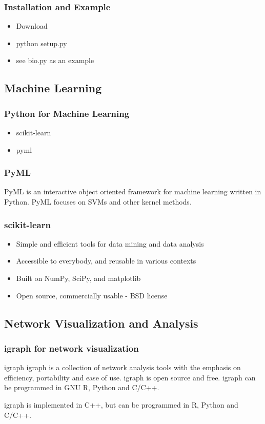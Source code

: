\documentclass[UTF8]{beamer}
\begin{document}
\begin{frame}
  \frametitle{Installation and Example}
  \begin{itemize}
    \item Download
    \item python setup.py
    \item see bio.py as an example
  \end{itemize}
\end{frame}


\subsection{Machine Learning}
\begin{frame}
  \frametitle{Python for Machine Learning}
  \begin{itemize}
    \item scikit-learn
    \item pyml
  \end{itemize}
\end{frame}

\begin{frame}
  \frametitle{PyML}
  PyML is an interactive object oriented framework for machine learning written
   in Python. PyML focuses on SVMs and other kernel methods.
\end{frame}

\begin{frame}
  \frametitle{scikit-learn}
  \begin{itemize}
    \item Simple and efficient tools for data mining and data analysis
    \item Accessible to everybody, and reusable in various contexts
    \item Built on NumPy, SciPy, and matplotlib
    \item Open source, commercially usable - BSD license
  \end{itemize}
\end{frame}

\subsection{Network Visualization and Analysis}
\begin{frame}
  \frametitle{igraph for network visualization}
  \begin{block}{igraph}
    igraph is a collection of network analysis tools with the emphasis on
    efficiency, portability and ease of use. igraph is open source and free.
    igraph can be programmed in GNU R, Python and C/C++.
  \end{block}

  igraph is implemented in C++, but can be programmed in R, Python and C/C++.
\end{frame}
\end{document}
